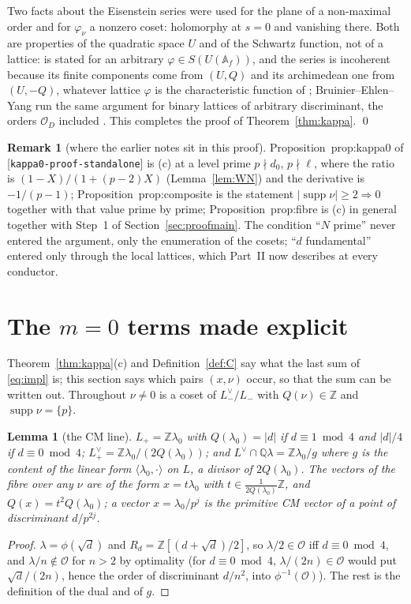 \documentclass[11pt,reqno]{amsart}
\theoremstyle{plain}
\newtheorem{lemma}[theorem]{Lemma}
\theoremstyle{definition}
\newtheorem{remark}[theorem]{Remark}
\DeclareMathOperator{\supp}{supp}
\newcommand{\Q}{\mathbb{Q}}
\newcommand{\Z}{\mathbb{Z}}
\newcommand{\A}{\mathbb{A}}
\newcommand{\Ldual}{L^{\vee}}
\newcommand{\Lm}{L_{-}}
\newcommand{\Lp}{L_{+}}
\newcommand{\parentref}[1]{\textup{[#1]}}
\begin{document}
Two facts about the Eisenstein series were used for the plane of a non-maximal order and for
$\varphi_\nu$ a nonzero coset: holomorphy at $s=0$ and vanishing there. Both are properties of the
quadratic space $U$ and of the Schwartz function, not of a lattice: \cite[Cor.~2.5]{KY} is stated
for an arbitrary $\varphi\in S(U(\A_f))$, and the series is incoherent because its finite
components come from $(U,Q)$ and its archimedean one from $(U,-Q)$, whatever lattice $\varphi$ is
the characteristic function of \cite[after (2.18)]{BY}; Bruinier--Ehlen--Yang run the same
argument for binary lattices of arbitrary discriminant, the orders $\mathcal O_D$ included
\cite[\S3]{BEY}. This completes the proof of Theorem~\ref{thm:kappa}. \qed

\begin{remark}[where the earlier notes sit in this proof]
Proposition~prop:kappa0 of \parentref{\texttt{kappa0-proof-standalone}} is (c) at a level prime
$p\nmid d_0$, $p\nmid\ell$, where the ratio is $(1-X)/(1+(p-2)X)$ (Lemma~\ref{lem:WN}) and the
derivative is $-1/(p-1)$; Proposition~prop:composite is the statement $|\supp\nu|\ge2\Rightarrow0$
together with that value prime by prime; Proposition~prop:fibre is (c) in general together with
Step~1 of Section~\ref{sec:proofmain}. The condition ``$N$ prime'' never entered the argument, only
the enumeration of the cosets; ``$d$ fundamental'' entered only through the local lattices, which
Part~II now describes at every conductor.
\end{remark}

\section{The $m=0$ terms made explicit}\label{sec:m0}

Theorem~\ref{thm:kappa}(c) and Definition~\ref{def:C} say what the last sum of \eqref{eq:impl} is;
this section says which pairs $(x,\nu)$ occur, so that the sum can be written out. Throughout
$\nu\neq0$ is a coset of $\Lm^\vee/\Lm$ with $Q(\nu)\in\Z$ and $\supp\nu=\{p\}$.

\begin{lemma}[the CM line]\label{lem:lambda0}
$\Lp=\Z\lambda_0$ with $Q(\lambda_0)=|d|$ if $d\equiv1\bmod4$ and $|d|/4$ if $d\equiv0\bmod4$;
$\Lp^\vee=\Z\lambda_0/(2Q(\lambda_0))$; and $\Ldual\cap\Q\lambda=\Z\lambda_0/g$ where $g$ is the
content of the linear form $\langle\lambda_0,\cdot\rangle$ on $L$, a divisor of $2Q(\lambda_0)$.
The vectors of the fibre over any $\nu$ are of the form $x=t\lambda_0$ with $t\in\frac1{2Q(\lambda_0)}\Z$,
and $Q(x)=t^2Q(\lambda_0)$; a vector $x=\lambda_0/p^j$ is the primitive CM vector of a point of
discriminant $d/p^{2j}$.
\end{lemma}
\begin{proof}
$\lambda=\phi(\sqrt d)$ and $R_d=\Z[(d+\sqrt d)/2]$, so $\lambda/2\in\mathcal O$ iff $d\equiv0\bmod4$,
and $\lambda/n\notin\mathcal O$ for $n>2$ by optimality (for $d\equiv0\bmod4$, $\lambda/(2n)\in
\mathcal O$ would put $\sqrt d/(2n)$, hence the order of discriminant $d/n^2$, into $\phi^{-1}(\mathcal O)$).
The rest is the definition of the dual and of $g$.
\end{proof}
\end{document}
